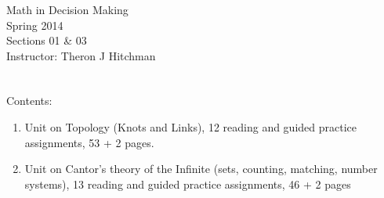 \documentclass[12pt]{article}
\begin{document}
\thispagestyle{empty}

\begin{center}
{\Huge Math in Decision Making}\\[1in]
{\Large Spring 2014}\\[.5in] 
{\Large Sections 01 \& 03}\\[.5in]
{\Large Instructor: Theron J Hitchman}
\end{center}



\clearpage
\thispagestyle{empty}
$\phantom{Theron J Hitchman}$
\newpage

{\Large
Contents:
\begin{enumerate}
\item Unit on Topology (Knots and Links), 12 reading and guided practice assignments, 53 + 2 pages.

\item Unit on Cantor's theory of the Infinite (sets, counting, matching, number systems), 13 reading and guided practice assignments, 46 + 2 pages
\end{enumerate}
}
\newpage
$\phantom{Theron J Hitchman}$
\newpage


$\phantom{Theron J Hitchman}$
\newpage

\end{document}
